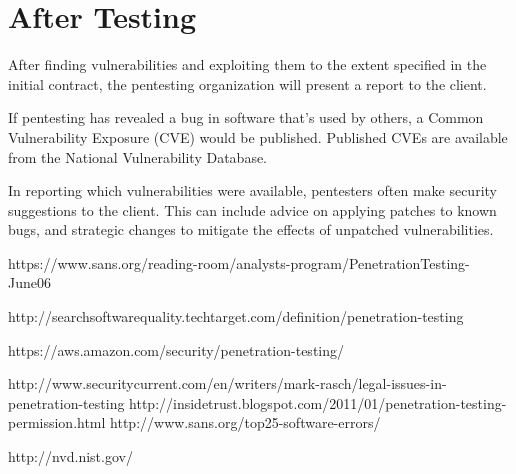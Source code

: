 \documentclass{report}
\begin{document}
\section*{After Testing}

After finding vulnerabilities and exploiting them to the extent specified in
the initial contract, the pentesting organization will present a report to the
client. 

If pentesting has revealed a bug in software that's used by others, a Common
Vulnerability Exposure (CVE) would be published. Published CVEs are available
from the National Vulnerability Database\cite{nvd}. 

In reporting which vulnerabilities were available, pentesters often make
security suggestions to the client. This can include advice on applying
patches to known bugs, and strategic changes to mitigate the effects of
unpatched vulnerabilities. 

\newpage
\begin{thebibliography}{1}
     https://www.sans.org/reading-room/analysts-program/PenetrationTesting-June06

        http://searchsoftwarequality.techtarget.com/definition/penetration-testing

     https://aws.amazon.com/security/penetration-testing/

        http://www.securitycurrent.com/en/writers/mark-rasch/legal-issues-in-penetration-testing
     http://insidetrust.blogspot.com/2011/01/penetration-testing-permission.html
        http://www.sans.org/top25-software-errors/

     http://nvd.nist.gov/
\end{thebibliography}
\end{document}

